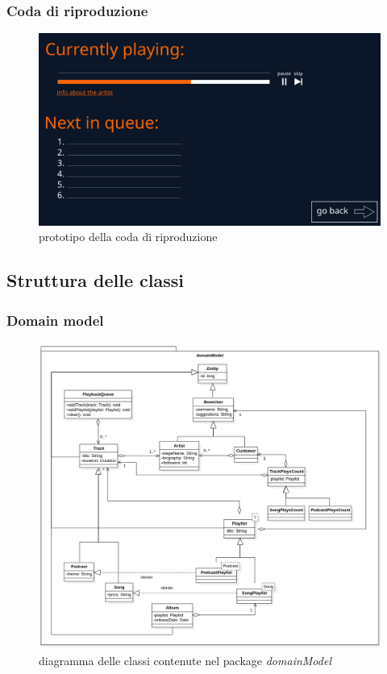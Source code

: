 \documentclass{article}
\begin{document}
  \subsubsection{Coda di riproduzione}
  \begin{figure}[H]
    \centering
    \includegraphics[scale=0.25]{playback}
    \caption{prototipo della coda di riproduzione}
    \label{fig:playbackQueue}
  \end{figure}



  \subsection{Struttura delle classi}

  \subsubsection{Domain model}
  \begin{figure}[H]
    \centering
    \includegraphics[width=0.9\linewidth]{domainModel.png}
    \caption{diagramma delle classi contenute nel package \textit{domainModel}}
    \label{fig:domainModel}
  \end{figure}
\end{document}
